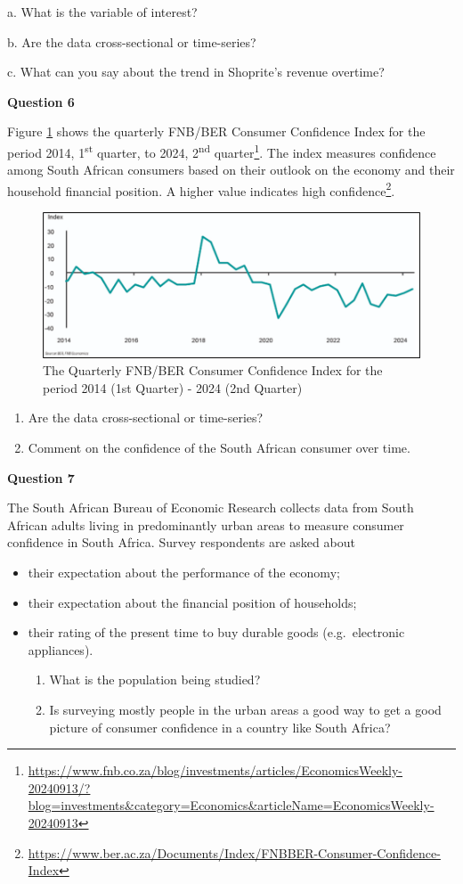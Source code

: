 \documentclass[
]{book}
\begin{document}
a. What is the variable of interest?

b. Are the data cross-sectional or time-series?

c. What can you say about the trend in Shoprite's revenue overtime?

\textbf{Question 6}

Figure \ref{fig:figFNB} shows the quarterly FNB/BER Consumer Confidence Index for the period 2014, 1\textsuperscript{st} quarter, to 2024, 2\textsuperscript{nd} quarter\footnote{\url{https://www.fnb.co.za/blog/investments/articles/EconomicsWeekly-20240913/?blog=investments&category=Economics&articleName=EconomicsWeekly-20240913}}. The index measures confidence among South African consumers based on their outlook on the economy and their household financial position. A higher value indicates high confidence\footnote{\url{https://www.ber.ac.za/Documents/Index/FNBBER-Consumer-Confidence-Index}}.

\begin{figure}
\includegraphics[width=0.6\linewidth]{images/clipboard-2186963206} \caption{The Quarterly FNB/BER Consumer Confidence Index for the period 2014 (1st Quarter) - 2024 (2nd Quarter)}\label{fig:figFNB}
\end{figure}

\begin{enumerate}
\def\labelenumi{\alph{enumi}.}
\item
  Are the data cross-sectional or time-series?
\item
  Comment on the confidence of the South African consumer over time.
\end{enumerate}

\textbf{Question 7}

The South African Bureau of Economic Research collects data from South African adults living in predominantly urban areas to measure consumer confidence in South Africa. Survey respondents are asked about

\begin{itemize}
\item
  their expectation about the performance of the economy;
\item
  their expectation about the financial position of households;
\item
  their rating of the present time to buy durable goods (e.g.~electronic appliances).

  \begin{enumerate}
  \def\labelenumi{\alph{enumi}.}
  \item
    What is the population being studied?
  \item
    Is surveying mostly people in the urban areas a good way to get a good picture of consumer confidence in a country like South Africa?
  \end{enumerate}
\end{itemize}
\end{document}
